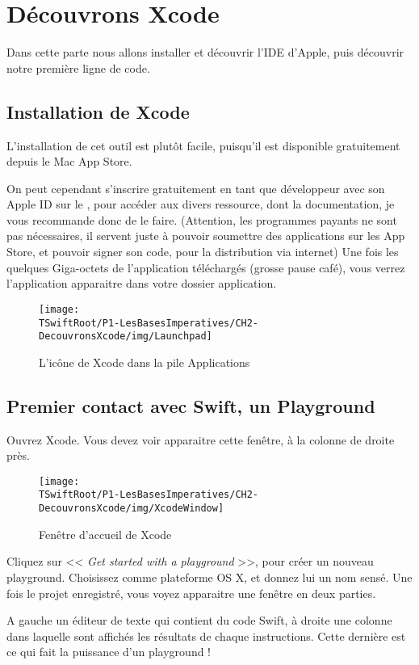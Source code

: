 \chapter{Découvrons Xcode}
Dans cette parte nous allons installer et découvrir l'IDE d’Apple,
puis découvrir notre première ligne de code.
\section{Installation de Xcode}
L'installation de cet outil est plutôt facile,
puisqu’il est disponible gratuitement depuis le Mac App Store.
 
On peut cependant s'inscrire gratuitement en tant que développeur
avec son Apple ID sur le
,
pour accéder aux divers ressource, dont la documentation,
je vous recommande donc de le faire.
(Attention, les programmes payants ne sont pas nécessaires,
il servent juste à pouvoir soumettre des applications sur les App Store,
et pouvoir signer son code, pour la distribution via internet)
Une fois les quelques Giga-octets de l'application téléchargés
(grosse pause café),
vous verrez l'application apparaitre dans votre dossier application.
\begin{figure}[H]
\centering
\texttt{[image: \\TSwiftRoot/P1-LesBasesImperatives/CH2-DecouvronsXcode/img/Launchpad]}
\caption{L'icône de Xcode dans la pile Applications}
\end{figure}

\section{Premier contact avec Swift, un Playground}
Ouvrez Xcode.
Vous devez voir apparaitre cette fenêtre, à la colonne de droite près.
\begin{figure}[H]
\centering
\texttt{[image: \\TSwiftRoot/P1-LesBasesImperatives/CH2-DecouvronsXcode/img/XcodeWindow]}
\caption{Fenêtre d'accueil de Xcode}
\end{figure}

Cliquez sur << \emph{Get started with a playground} >>,
pour créer un nouveau playground.
Choisissez comme plateforme OS X, et donnez lui un nom sensé.
Une fois le projet enregistré, vous voyez apparaitre une fenêtre en deux parties.

A gauche un éditeur de texte qui contient du code Swift,
à droite une colonne dans laquelle sont affichés
les résultats de chaque instructions.
Cette dernière est ce qui fait la puissance d'un playground !

